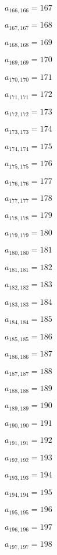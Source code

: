 \documentclass[a4paper,12pt]{article}
\begin{document}
$a _{ 166, 166 } = 167$

$a _{ 167, 167 } = 168$

$a _{ 168, 168 } = 169$

$a _{ 169, 169 } = 170$

$a _{ 170, 170 } = 171$

$a _{ 171, 171 } = 172$

$a _{ 172, 172 } = 173$

$a _{ 173, 173 } = 174$

$a _{ 174, 174 } = 175$

$a _{ 175, 175 } = 176$

$a _{ 176, 176 } = 177$

$a _{ 177, 177 } = 178$

$a _{ 178, 178 } = 179$

$a _{ 179, 179 } = 180$

$a _{ 180, 180 } = 181$

$a _{ 181, 181 } = 182$

$a _{ 182, 182 } = 183$

$a _{ 183, 183 } = 184$

$a _{ 184, 184 } = 185$

$a _{ 185, 185 } = 186$

$a _{ 186, 186 } = 187$

$a _{ 187, 187 } = 188$

$a _{ 188, 188 } = 189$

$a _{ 189, 189 } = 190$

$a _{ 190, 190 } = 191$

$a _{ 191, 191 } = 192$

$a _{ 192, 192 } = 193$

$a _{ 193, 193 } = 194$

$a _{ 194, 194 } = 195$

$a _{ 195, 195 } = 196$

$a _{ 196, 196 } = 197$

$a _{ 197, 197 } = 198$
\end{document}
